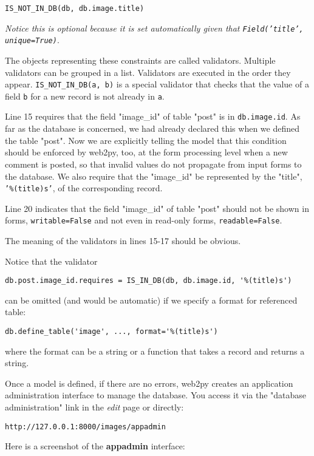 \documentclass[justified,sixbynine,notoc]{tufte-book}
\def\ft{\small\tt}
\def\inxx#1{\index{#1}}
\begin{document}
\begin{fullwidth}
{\ft IS\_NOT\_IN\_DB(db, db.image.title)}

{\it Notice this is optional because it is set automatically given that {\ft Field('title', unique=True)}}.

The objects representing these constraints are called validators. Multiple validators can be grouped in a list. Validators are executed in the order they appear.
{\ft IS\_NOT\_IN\_DB(a, b)} is a special validator that checks that the value of a field {\ft b} for a new record is not already in {\ft a}.

Line 15 requires that the field "image\_id" of table "post" is in {\ft db.image.id}. As far as the database is concerned, we had already declared this  when we defined the table "post".
Now we are explicitly telling the model that this condition should be enforced by web2py, too, at the form processing level when a new comment is posted, so that invalid values do not propagate from input forms to the database. We also require that the "image\_id" be represented by the "title", {\ft '\%(title)s'}, of the corresponding record.

Line 20 indicates that the field "image\_id" of table "post" should not be shown in forms, {\ft writable=False} and not even in read-only forms, {\ft readable=False}.

The meaning of the validators in lines 15-17 should be obvious.

\inxx{format}
Notice that the validator
\begin{lstlisting}
db.post.image_id.requires = IS_IN_DB(db, db.image.id, '%(title)s')
\end{lstlisting}
\noindent can be omitted (and would be automatic) if we specify a format for referenced table:
\begin{lstlisting}
db.define_table('image', ..., format='%(title)s')
\end{lstlisting}
\noindent where the format can be a string or a function that takes a record and returns a string.

\inxx{appadmin}
Once a model is defined, if there are no errors, web2py creates an application administration interface to manage the database. You access it via the "database administration" link in the {\it edit} page or directly:
\begin{lstlisting}[keywords={}]
http://127.0.0.1:8000/images/appadmin
\end{lstlisting}

Here is a screenshot of the {\bf appadmin} interface:



\end{fullwidth}
\end{document}
